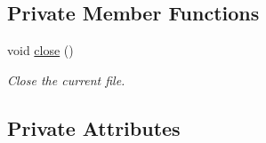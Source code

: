 \subsection*{Private Member Functions}
\begin{DoxyCompactItemize}
\item 
void \mbox{\hyperlink{classsf_1_1_input_sound_file_ad28182aea9dc9f7d0dfc7f78691825b4}{close}} ()
\begin{DoxyCompactList}\small\item\em Close the current file. \end{DoxyCompactList}\end{DoxyCompactItemize}
\subsection*{Private Attributes}
